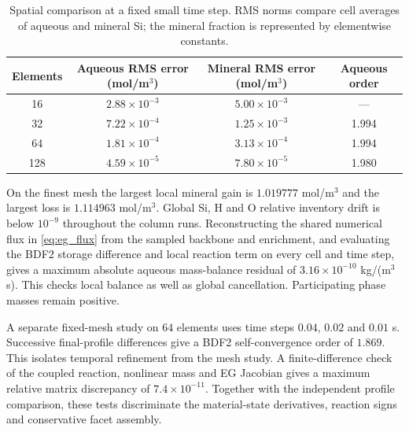 \documentclass[11pt]{article}
\begin{document}
\begin{table}[htbp]
\centering\small
\begin{tabular}{cccc}
\toprule
Elements & Aqueous RMS error (mol/m\(^3\)) & Mineral RMS error (mol/m\(^3\)) & Aqueous order\\
\midrule
16 & \(2.88\times10^{-3}\) & \(5.00\times10^{-3}\) & ---\\
32 & \(7.22\times10^{-4}\) & \(1.25\times10^{-3}\) & 1.994\\
64 & \(1.81\times10^{-4}\) & \(3.13\times10^{-4}\) & 1.994\\
128 & \(4.59\times10^{-5}\) & \(7.80\times10^{-5}\) & 1.980\\
\bottomrule
\end{tabular}
\caption{Spatial comparison at a fixed small time step. RMS norms compare cell averages of aqueous and mineral Si; the mineral fraction is represented by elementwise constants.}
\label{tab:silica_space}
\end{table}

On the finest mesh the largest local mineral gain is \(1.019777\) mol/m\(^3\) and the largest loss is \(1.114963\) mol/m\(^3\). Global Si, H and O relative inventory drift is below \(10^{-9}\) throughout the column runs. Reconstructing the shared numerical flux in \eqref{eq:eg_flux} from the sampled backbone and enrichment, and evaluating the BDF2 storage difference and local reaction term on every cell and time step, gives a maximum absolute aqueous mass-balance residual of \(3.16\times10^{-10}\) kg/(m\(^3\)s). This checks local balance as well as global cancellation. Participating phase masses remain positive.

A separate fixed-mesh study on \(64\) elements uses time steps \(0.04\), \(0.02\) and \(0.01\) s. Successive final-profile differences give a BDF2 self-convergence order of \(1.869\). This isolates temporal refinement from the mesh study. A finite-difference check of the coupled reaction, nonlinear mass and EG Jacobian gives a maximum relative matrix discrepancy of \(7.4\times10^{-11}\). Together with the independent profile comparison, these tests discriminate the material-state derivatives, reaction signs and conservative facet assembly.
\end{document}
